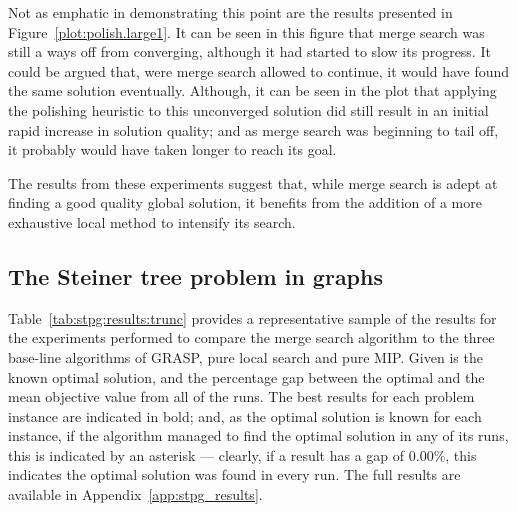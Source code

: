 \documentclass[journal]{IEEEtran}
\begin{document}
Not as emphatic in demonstrating this point are the results presented in Figure~\ref{plot:polish.large1}. It can be seen in this figure that merge search was still a ways off from converging, although it had started to slow its progress. It could be argued that, were merge search allowed to continue, it would have found the same solution eventually. Although, it can be seen in the plot that applying the polishing heuristic to this unconverged solution did still result in an initial rapid increase in solution quality; and as merge search was beginning to tail off, it probably would have taken longer to reach its goal.

The results from these experiments suggest that, while merge search is adept at finding a good quality global solution, it benefits from the addition of a more exhaustive local method to intensify its search. 


\subsection{The Steiner tree problem in graphs}

Table~\ref{tab:stpg:results:trunc} provides a representative sample of the results for the experiments performed to compare the merge search algorithm to the three base-line algorithms of GRASP, pure local search and pure MIP. Given is the known optimal solution, and the percentage gap between the optimal and the mean objective value from all of the runs. The best results for each problem instance are indicated in bold; and, as the optimal solution is known for each instance, if the algorithm managed to find the optimal solution in any of its runs, this is indicated by an asterisk --- clearly, if a result has a gap of 0.00\%, this indicates the optimal solution was found in every run. The full results are available in Appendix~\ref{app:stpg_results}.
\end{document}
